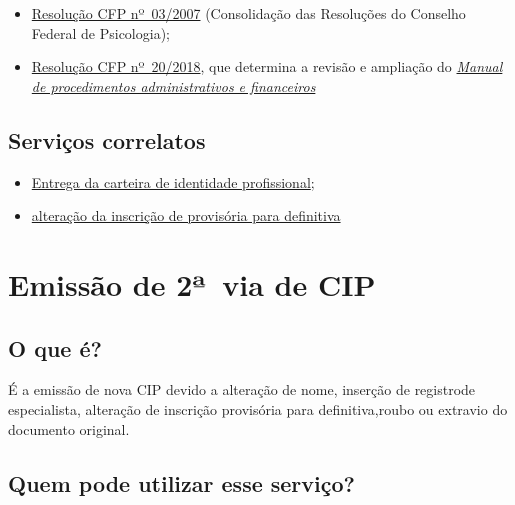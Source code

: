 \begin{itemize}
  \item  \href{https://atosoficiais.com.br/cfp/resolucao-administrativa-financeira-n-3-2007-institui-a-consolidacao-das-resolucoes-do-conselho-federal-de-psicologia?origin=instituicao&q=resolu\%C3\%A7\%C3\%A3o\%203/2007}{Resolução  CFP nº~03/2007} (Consolidação das Resoluções do Conselho Federal de  Psicologia);
  \item  \href{https://transparencia.cfp.org.br/wp-content/uploads/sites/7/2020/05/Manual-de-Procedimentos-Administrativos-e-Financeiro-CFP-RES-20.2018.pdf}{\href{https://atosoficiais.com.br/cfp/resolucao-administrativa-financeira-n-20-2018-altera-o-manual-de-procedimentos-administrativo-e-financeiro-do-sistema-conselhos-de-psicologia-anexo-da-resolucao-cfp-n-202018-a-resolucao-cfp-n-03-2007-a-resolucao-cfp-n-16-2019-e-da-outras-providencias}{Resolução  CFP nº~20/2018}}, que determina a revisão e ampliação do  \href{https://transparencia.cfp.org.br/wp-content/uploads/sites/7/2020/05/Manual-de-Procedimentos-Administrativos-e-Financeiro-CFP-RES-20.2018.pdf}{\emph{Manual  de procedimentos administrativos e financeiros}}
\end{itemize}

\section{Serviços correlatos}

\begin{itemize}
  \item  \hyperref[]{Entrega  da carteira de identidade profissional};
  \item  \hyperref[]{alteração  da inscrição de provisória para definitiva}
\end{itemize}

\chapter{Emissão de 2ª~via de CIP}


\section{O que é?}

É a emissão de nova CIP devido a alteração de nome, inserção de registrode especialista, alteração de inscrição provisória para definitiva,roubo ou extravio do documento original.

\section{Quem pode utilizar esse serviço?}

